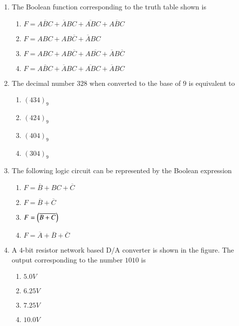 \documentclass[journal]{IEEEtran}
\begin{document}
\begin{enumerate}
    \item The Boolean function corresponding to the truth table shown is
        \begin{table}[!ht]
            \centering
            
        \end{table}
        \begin{enumerate}
            \item $F=A\overline{B}C+\overline{A}BC+\overline{AB}C+\overline{ABC}$
            \item $F=ABC+AB\overline{C}+\overline{A}BC$
            \item $F=ABC+AB\overline{C}+A\overline{BC}+\overline{A}B\overline{C}$
            \item $F=A\overline{B}C+\overline{A}BC+\overline{AB}C+\overline{A}BC$
        \end{enumerate}

    \item The decimal number $328$ when converted to the base of $9$ is equivalent to 
        \begin{enumerate}
            \item $(434)_9$
            \item $(424)_9$
            \item $(404)_9$
            \item $(304)_9$
        \end{enumerate}

    \item The following logic circuit can be represented by the Boolean expression
        \begin{figure}[!ht]
            \centering
            
        \end{figure}
        \begin{enumerate}
            \item $F=\overline{B}+BC+\overline{C}$
            \item $F=\overline{B}+\overline{C}$
            \item $F=\left(\overline{B+C}\right)$
            \item $F=\overline{A}+\overline{B}+\overline{C}$
        \end{enumerate}

    \item A $4$-bit resistor network based D/A converter is shown in the figure. The output corresponding to the number $1010$ is
        \begin{figure}[!ht]
            \centering
            
        \end{figure}
        \begin{enumerate}
            \item $5.0V$
            \item $6.25V$
            \item $7.25V$
            \item $10.0V$
        \end{enumerate}


\end{enumerate}
\end{document}
